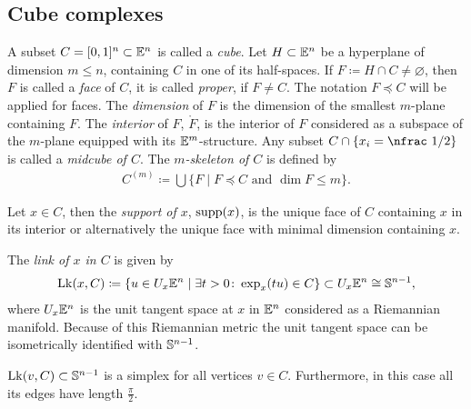 \subsection{Cube complexes}
\label{sec:complex}
\begin{defin}[Cubes]
  A subset \(C = [0,1]^n \subset \mathbb{E}^n\) is called a \emph{cube}. Let \(H \subset \mathbb{E}^n\)  be a hyperplane of dimension \(m \leq n\), containing \(C\) in one of its half-spaces. If \(F \coloneqq H \cap C \neq \varnothing\), then \(F\) is called a \emph{face} of \(C\), it is called \emph{proper}, if \(F \neq C\). The notation \(F \preceq C\) will be applied for faces. The \emph{dimension} of \(F\) is the dimension of the smallest \(m\)-plane containing \(F\). The \emph{interior} of \(F\), \(\mathring F\), is the interior of \(F\) considered as a subspace of the \(m\)-plane equipped with its \(\mathbb{E}^m\)-structure. Any subset \(C \cap \{x_i = \text{\nfrac 1/2}\}\) is called a \emph{midcube of \(C\)}. The \emph{\(m\)-skeleton of \(C\)} is defined by
  \begin{align*}
    C^{(m)} \coloneqq \bigcup \{F \mid F \preceq C \text{ and } \dim F \leq m\}.
  \end{align*}

  Let \(x \in C\), then the \emph{support of \(x\)}, \(\operatorname{supp}(x)\), is the unique face of \(C\) containing \(x\) in its interior or alternatively the unique face with minimal dimension containing \(x\).

  The \emph{link of \(x\) in \(C\)} is given by
  \begin{align*}
    \operatorname{Lk}(x,C) \coloneqq \{u \in U_x\mathbb{E}^n \mid \exists t > 0 \colon \exp_x(tu) \in C\} \subset U_x\mathbb{E}^n \cong \mathbb{S}^{n-1},
  \end{align*}
  where \(U_x\mathbb{E}^n\) is the unit tangent space at \(x\) in \(\mathbb{E}^n\) considered as a Riemannian manifold. Because of this Riemannian metric the unit tangent space can be isometrically identified with \(\mathbb{S}^{n-1}\).
\end{defin}

\begin{rem}
  \(\operatorname{Lk}(v,C) \subset \mathbb{S}^{n-1}\) is a simplex for all vertices \(v \in C\). Furthermore, in this case all its edges have length \(\frac{\pi}{2}\).
\end{rem}

